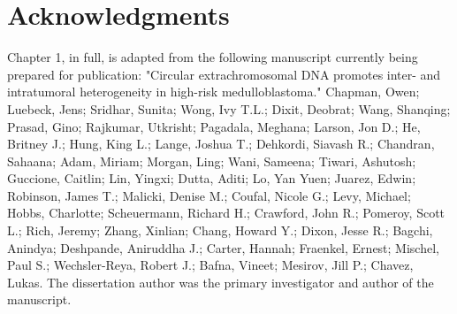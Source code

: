 \section{Acknowledgments}

\ackfunding

\par Chapter 1, in full, is adapted from the following manuscript currently being prepared for publication: "Circular extrachromosomal DNA promotes inter- and intratumoral heterogeneity in high-risk medulloblastoma." Chapman, Owen; Luebeck, Jens; Sridhar, Sunita; Wong, Ivy T.L.; Dixit, Deobrat; Wang, Shanqing; Prasad, Gino; Rajkumar, Utkrisht; Pagadala, Meghana; Larson, Jon D.; He, Britney J.; Hung, King L.; Lange, Joshua T.; Dehkordi, Siavash R.; Chandran, Sahaana; Adam, Miriam; Morgan, Ling; Wani, Sameena; Tiwari, Ashutosh; Guccione, Caitlin; Lin, Yingxi; Dutta, Aditi; Lo, Yan Yuen; Juarez, Edwin; Robinson, James T.; Malicki, Denise M.; Coufal, Nicole G.; Levy, Michael; Hobbs, Charlotte; Scheuermann, Richard H.; Crawford, John R.; Pomeroy, Scott L.; Rich, Jeremy; Zhang, Xinlian; Chang, Howard Y.; Dixon, Jesse R.; Bagchi, Anindya; Deshpande, Aniruddha J.; Carter, Hannah; Fraenkel, Ernest; Mischel, Paul S.; Wechsler-Reya, Robert J.; Bafna, Vineet; Mesirov, Jill P.; Chavez, Lukas. The dissertation author was the primary investigator and author of the manuscript.

